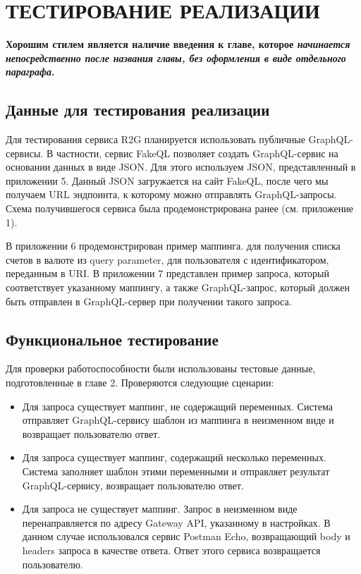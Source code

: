 \chapter{ТЕСТИРОВАНИЕ РЕАЛИЗАЦИИ} \label{ch4}

\textbf{Хорошим стилем является наличие введения к главе, которое \textit{начинается непосредственно после названия главы, без оформления в виде отдельного параграфа}.}

\section{Данные для тестирования реализации}\label{sec:testing-data}

Для тестирования сервиса R2G планируется использовать публичные GraphQL-сервисы.
В частности, сервис FakeQL позволяет создать GraphQL-сервис на основании данных в виде JSON. Для этого используем JSON, представленный в приложении 5.
Данный JSON загружается на сайт FakeQL, после чего мы получаем URL эндпоинта, к которому можно отправлять GraphQL-запросы.
Схема получившегося сервиса была продемонстрирована ранее (см. приложение 1).

В приложении 6 продемонстрирован пример маппинга. %
для получения списка счетов в валюте из query parameter, для пользователя с идентификатором, переданным в URI. В приложении 7 представлен пример запроса, который соответствует указанному маппингу, а также GraphQL-запрос, который должен быть отправлен в GraphQL-сервер при получении такого запроса.

\section{Функциональное тестирование} \label{sec:ch4-functional}

	Для проверки работоспособности были использованы тестовые данные, подготовленные в главе 2.
	Проверяются следующие сценарии:

\begin{itemize}
	\item Для запроса существует маппинг, не содержащий переменных.
	Система отправляет GraphQL-сервису шаблон из маппинга в неизменном виде и возвращает пользователю ответ.

	\item Для запроса существует маппинг, содержащий несколько переменных.
	Система заполняет шаблон этими переменными и отправляет результат GraphQL-сервису, возвращает пользователю ответ.

    \item Для запроса не существует маппинг.
	Запрос в неизменном виде перенаправляется по адресу Gateway API, указанному в настройках.
	В данном случае использовался сервис Postman Echo, возвращающий body и headers запроса в качестве ответа.
	Ответ этого сервиса возвращается пользователю.
\end{itemize}

